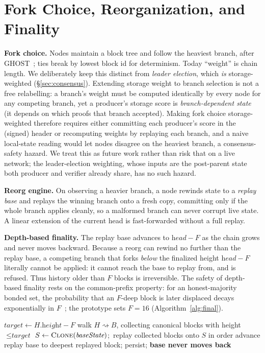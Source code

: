 \section{Fork Choice, Reorganization, and Finality}
\label{sec:fork}
\textbf{Fork choice.} Nodes maintain a block tree and follow the heaviest branch, after
GHOST~\cite{sompolinsky2015ghost}; ties break by lowest block id for determinism. Today
``weight'' is chain length. We deliberately keep this distinct from \emph{leader election}, which
\emph{is} storage-weighted (\S\ref{sec:consensus}). Extending storage weight to branch selection is
not a free relabelling: a branch's weight must be computed identically by every node for any
competing branch, yet a producer's storage score is \emph{branch-dependent state} (it depends on
which proofs that branch accepted). Making fork choice storage-weighted therefore requires either
committing each producer's score in the (signed) header or recomputing weights by replaying each
branch, and a naive local-state reading would let nodes disagree on the heaviest branch, a
consensus-safety hazard. We treat this as future work rather than risk that on a live network; the
leader-election weighting, whose inputs are the post-parent state both producer and verifier already
share, has no such hazard.

\textbf{Reorg engine.} On observing a heavier branch, a node rewinds state to a \emph{replay
base} and replays the winning branch onto a fresh copy, committing only if the whole branch
applies cleanly, so a malformed branch can never corrupt live state. A linear extension of
the current head is fast-forwarded without a full replay.

\textbf{Depth-based finality.} The replay base advances to $\textit{head}-F$ as the chain grows
and never moves backward. Because a reorg can rewind no further than the replay base, a
competing branch that forks \emph{below} the finalized height $\textit{head}-F$ literally cannot
be applied: it cannot reach the base to replay from, and is refused. Thus history older than
$F$ blocks is irreversible. The safety of depth-based finality rests on the common-prefix
property: for an honest-majority bonded set, the probability that an $F$-deep block is later
displaced decays exponentially in $F$~\cite{garay2015backbone}; the prototype sets $F{=}16$
(Algorithm~\ref{alg:final}).

\begin{algorithm}[t]
\SetAlgoLined\DontPrintSemicolon
{}
$\textit{target} \leftarrow H.\textit{height}-F$\;
walk $H \rightsquigarrow B$, collecting canonical blocks with height $\le \textit{target}$\;
$S \leftarrow \textsc{Clone}(\textit{baseState})$;\ replay collected blocks onto $S$ in order\;
advance replay base to deepest replayed block; persist; \textbf{base never moves back}\;
\caption{Depth-based finality advance (after the head changes).}
\label{alg:final}
\end{algorithm}

